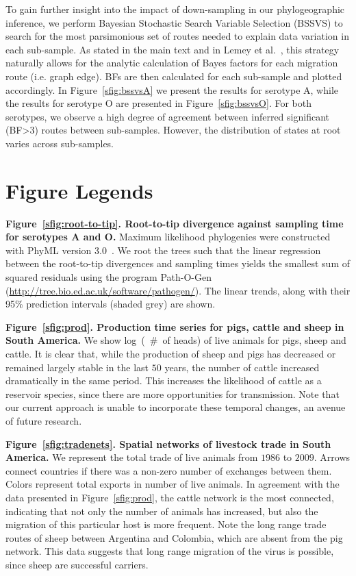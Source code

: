 \documentclass[a4paper,10pt]{article}
\begin{document}
To gain further insight into the impact of down-sampling in our phylogeographic inference, we perform Bayesian Stochastic Search Variable Selection (BSSVS) to search for the most parsimonious set of routes needed to explain data variation in each sub-sample.
As stated in the main text and in Lemey et al.~\cite{M-roots}, this strategy naturally allows for the analytic calculation of Bayes factors for each migration route (i.e. graph edge).
BFs are then calculated for each sub-sample and plotted accordingly.
In Figure~\ref{sfig:bssvsA} we present the results for serotype A, while the results for serotype O are presented in Figure~\ref{sfig:bssvsO}.
For both serotypes, we observe a high degree of agreement between inferred significant (BF>3) routes between sub-samples.
However, the distribution of states at root varies across sub-samples.




\section*{Figure Legends}

\textbf{Figure~\ref{sfig:root-to-tip}. Root-to-tip divergence against sampling time for serotypes A and O.}
Maximum likelihood phylogenies were constructed with PhyML version 3.0~\cite{M-phyml}. 
We root the trees such that the linear regression between the root-to-tip divergences and sampling times yields the smallest sum of squared residuals using the program Path-O-Gen (\url{http://tree.bio.ed.ac.uk/software/pathogen/}).
The linear trends, along with their 95\% prediction intervals (shaded grey) are shown.

\textbf{Figure~\ref{sfig:prod}. Production time series for pigs, cattle and sheep in South America.}
We show log~(~\#~of heads) of live animals for pigs, sheep and cattle.
It is clear that, while the production of sheep and pigs has decreased or remained largely stable in the last $50$ years, the number of cattle increased dramatically in the same period.
This increases the likelihood of cattle as a reservoir species, since there are more opportunities for transmission.
Note that our current approach is unable to incorporate these temporal changes, an avenue of future research.

\textbf{Figure~\ref{sfig:tradenets}. Spatial networks of livestock trade in South America.}
We represent the total trade of live animals from $1986$ to $2009$.
Arrows connect countries if there was a non-zero number of exchanges between them.
Colors represent total exports in number of live animals.
In agreement with the data presented in Figure~\ref{sfig:prod}, the cattle network is the most connected, indicating that not only the number of animals has increased, but also the migration of this particular host is more frequent. 
Note the long range trade routes of sheep between Argentina and Colombia, which are absent from the pig network.
This data suggests that long range migration of the virus is possible, since sheep are successful carriers.
\end{document}
